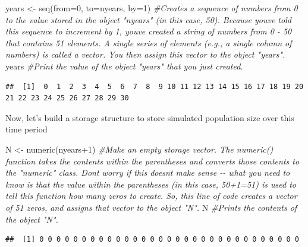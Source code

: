 \documentclass[
]{article}
\newenvironment{Shaded}{\begin{snugshade}}{\end{snugshade}}
\newcommand{\AttributeTok}[1]{\textcolor[rgb]{0.77,0.63,0.00}{#1}}
\newcommand{\CommentTok}[1]{\textcolor[rgb]{0.56,0.35,0.01}{\textit{#1}}}
\newcommand{\DecValTok}[1]{\textcolor[rgb]{0.00,0.00,0.81}{#1}}
\newcommand{\FunctionTok}[1]{\textcolor[rgb]{0.00,0.00,0.00}{#1}}
\newcommand{\NormalTok}[1]{#1}
\newcommand{\OtherTok}[1]{\textcolor[rgb]{0.56,0.35,0.01}{#1}}
\newcommand{\SpecialCharTok}[1]{\textcolor[rgb]{0.00,0.00,0.00}{#1}}
\begin{document}
\begin{Shaded}
\begin{Highlighting}[]
\NormalTok{years }\OtherTok{\textless{}{-}} \FunctionTok{seq}\NormalTok{(}\AttributeTok{from=}\DecValTok{0}\NormalTok{, }\AttributeTok{to=}\NormalTok{nyears, }\AttributeTok{by=}\DecValTok{1}\NormalTok{)   }\CommentTok{\#Creates a sequence of numbers from 0 to the value stored in the object "nyears" (in this case, 50). Because you\textquotesingle{}ve told this sequence to increment by 1, you\textquotesingle{}ve created a string of numbers from 0 {-} 50 that contains 51 elements. A single series of elements (e.g., a single column of numbers) is called a vector. You then assign this vector to the object "years".}
\NormalTok{years                                   }\CommentTok{\#Print the value of the object "years" that you just created.}
\end{Highlighting}
\end{Shaded}

\begin{verbatim}
##  [1]  0  1  2  3  4  5  6  7  8  9 10 11 12 13 14 15 16 17 18 19 20 21 22 23 24 25 26 27 28 29 30
\end{verbatim}

Now, let's build a storage structure to store simulated population size
over this time period

\begin{Shaded}
\begin{Highlighting}[]
\NormalTok{N }\OtherTok{\textless{}{-}} \FunctionTok{numeric}\NormalTok{(nyears}\SpecialCharTok{+}\DecValTok{1}\NormalTok{)    }\CommentTok{\#Make an empty storage vector. The numeric() function takes the contents within the parentheses and converts those contents to the "numeric" class. Don\textquotesingle{}t worry if this doesn\textquotesingle{}t make sense {-}{-} what you need to know is that the value within the parentheses (in this case, 50+1=51) is used to tell this function how many zeros to create. So, this line of code creates a vector of 51 zeros, and assigns that vector to the object "N".}
\NormalTok{N                         }\CommentTok{\#Prints the contents of the object "N".}
\end{Highlighting}
\end{Shaded}

\begin{verbatim}
##  [1] 0 0 0 0 0 0 0 0 0 0 0 0 0 0 0 0 0 0 0 0 0 0 0 0 0 0 0 0 0 0 0
\end{verbatim}
\end{document}

